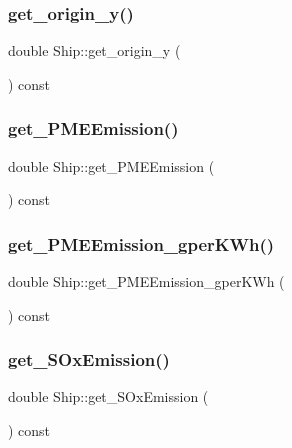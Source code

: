\mbox{\label{class_ship_acefd31c97b2109ff2d02dcef6c4d52d0}} 
\subsubsection{\texorpdfstring{get\_origin\_y()}{get\_origin\_y()}}
{\footnotesize\ttfamily double Ship\+::get\+\_\+origin\+\_\+y (\begin{DoxyParamCaption}{ }\end{DoxyParamCaption}) const}

\mbox{\label{class_ship_ab626df07c2a45cc09fa7b3c98e8e2a9c}} 
\subsubsection{\texorpdfstring{get\_PMEEmission()}{get\_PMEEmission()}}
{\footnotesize\ttfamily double Ship\+::get\+\_\+\+P\+M\+E\+Emission (\begin{DoxyParamCaption}{ }\end{DoxyParamCaption}) const}

\mbox{\label{class_ship_a34ec4da6b3f3494592ce0fb67d24c09c}} 
\subsubsection{\texorpdfstring{get\_PMEEmission\_gperKWh()}{get\_PMEEmission\_gperKWh()}}
{\footnotesize\ttfamily double Ship\+::get\+\_\+\+P\+M\+E\+Emission\+\_\+gper\+K\+Wh (\begin{DoxyParamCaption}{ }\end{DoxyParamCaption}) const}

\mbox{\label{class_ship_a07c4f505be69cf3093bbdafa00131dcc}} 
\subsubsection{\texorpdfstring{get\_SOxEmission()}{get\_SOxEmission()}}
{\footnotesize\ttfamily double Ship\+::get\+\_\+\+S\+Ox\+Emission (\begin{DoxyParamCaption}{ }\end{DoxyParamCaption}) const}

